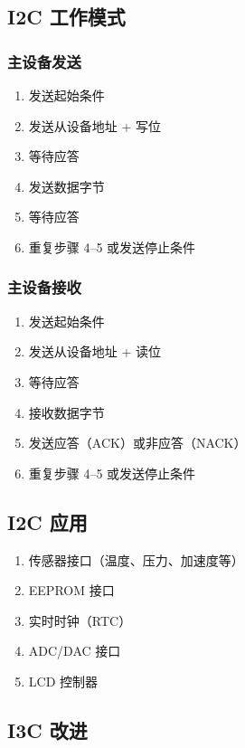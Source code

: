 \subsection{I2C 工作模式}

\subsubsection{主设备发送}

\begin{enumerate}
  \item 发送起始条件
  \item 发送从设备地址 + 写位
  \item 等待应答
  \item 发送数据字节
  \item 等待应答
  \item 重复步骤 4--5 或发送停止条件
\end{enumerate}

\subsubsection{主设备接收}

\begin{enumerate}
  \item 发送起始条件
  \item 发送从设备地址 + 读位
  \item 等待应答
  \item 接收数据字节
  \item 发送应答（ACK）或非应答（NACK）
  \item 重复步骤 4--5 或发送停止条件
\end{enumerate}

\subsection{I2C 应用}

\begin{enumerate}
  \item 传感器接口（温度、压力、加速度等）
  \item EEPROM 接口
  \item 实时时钟（RTC）
  \item ADC/DAC 接口
  \item LCD 控制器
\end{enumerate}

\subsection{I3C 改进}

